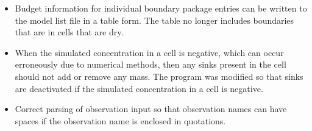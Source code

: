 \documentclass[11pt,twoside,twocolumn]{usgsreport}
\begin{document}
\begin{itemize}
\begin{itemize}
	        \item Budget information for individual boundary package entries can be written to the model list file in a table form.  The table no longer includes boundaries that are in cells that are dry.
	        \item When the simulated concentration in a cell is negative, which can occur erroneously due to numerical methods, then any sinks present in the cell should not add or remove any mass.  The program was modified so that sinks are deactivated if the simulated concentration in a cell is negative.
	        \item Correct parsing of observation input so that observation names can have spaces if the observation name is enclosed in quotations.
	\end{itemize}


\end{itemize}
\end{document}
